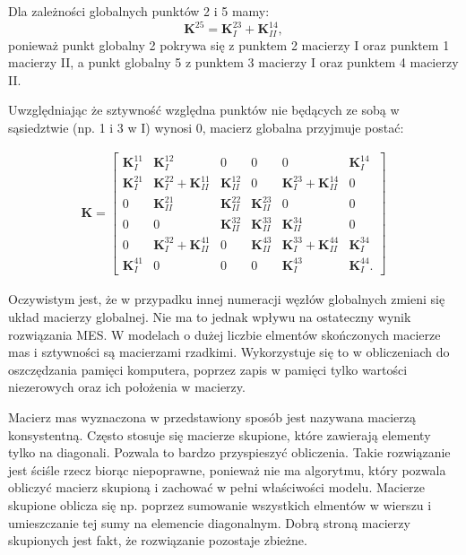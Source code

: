 Dla zależności globalnych punktów 2 i 5 mamy:
\begin{equation}
	\textbf{K}^{25} = \textbf{K}_{I}^{23} + \textbf{K}_{II}^{14},
\end{equation}
ponieważ punkt globalny 2 pokrywa się z punktem 2 macierzy I oraz punktem 1 macierzy II, a punkt globalny 5 z punktem 3 macierzy I oraz punktem 4 macierzy II.

Uwzględniając że sztywność względna punktów nie będących ze sobą w sąsiedztwie (np. 1 i 3 w I) wynosi 0, macierz globalna przyjmuje postać:

\begin{gather}
	\textbf{K} = \begin{bmatrix} 
	 	\textbf{K}^{11}_I & \textbf{K}^{12}_I & 0 & 0 & 0 & \textbf{K}^{14}_I  \\
	 	\textbf{K}^{21}_I & \textbf{K}^{22}_I + \textbf{K}^{11}_{II}  & \textbf{K}^{12}_{II} & 0 & \textbf{K}_{I}^{23} + \textbf{K}_{II}^{14} & 0 \\
	 	0 & \textbf{K}^{21}_{II} & \textbf{K}^{22}_{II} & \textbf{K}^{23}_{II} & 0 & 0 \\
	 	0 & 0 & \textbf{K}^{32}_{II} & \textbf{K}^{33}_{II} & \textbf{K}^{34}_{II} & 0 \\
		0 & \textbf{K}_{I}^{32} + \textbf{K}_{II}^{41} & 0 & \textbf{K}^{43}_{II} & \textbf{K}^{33}_{I} + \textbf{K}	^{44}_{II} & \textbf{K}^{34}_{I} \\
		\textbf{K}^{41}_I & 0 & 0 & 0 & \textbf{K}^{43}_I & \textbf{K}^{44}_I.
	\end{bmatrix}
\end{gather}

Oczywistym jest, że w przypadku innej numeracji węzłów globalnych zmieni się układ macierzy globalnej. Nie ma to jednak wpływu na ostateczny wynik rozwiązania MES. W modelach o dużej liczbie elmentów skończonych macierze mas i sztywności są macierzami rzadkimi. Wykorzystuje się to w obliczeniach do oszczędzania pamięci komputera, poprzez zapis w pamięci tylko wartości niezerowych oraz ich położenia w macierzy. 

Macierz mas wyznaczona w przedstawiony sposób jest nazywana macierzą konsystentną. Często stosuje się macierze skupione, które zawierają elementy tylko na diagonali. Pozwala to bardzo przyspieszyć obliczenia. Takie rozwiązanie jest ściśle rzecz biorąc niepoprawne, ponieważ nie ma algorytmu, który pozwala obliczyć macierz skupioną i zachować w pełni właściwości modelu. Macierze skupione oblicza się np. poprzez sumowanie wszystkich elmentów w wierszu i umieszczanie tej sumy na elemencie diagonalnym. Dobrą stroną macierzy skupionych jest fakt, że rozwiązanie pozostaje zbieżne.



















